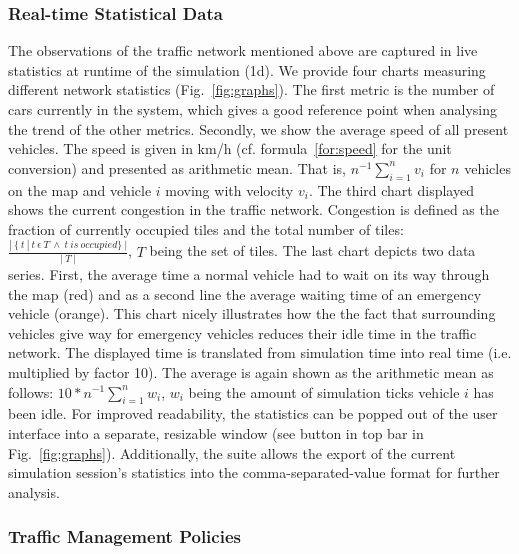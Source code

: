 \subsubsection*{Real-time Statistical Data}

The observations of the traffic network mentioned above are captured in live statistics at runtime of the simulation (1d).  We provide four charts measuring different network statistics (Fig.~\ref{fig:graphs}). The first metric is the number of cars currently in the system, which gives a good reference point when analysing the trend of the other metrics. Secondly, we show the average speed of all present vehicles. The speed is given in km/h (cf. formula~\ref{for:speed} for the unit conversion) and presented as arithmetic mean. That is, $ n^{-1}\sum\limits_{i=1}^n v_i$ for $n$ vehicles on the map and vehicle $i$ moving with velocity $v_i$. The third chart displayed shows the current congestion in the traffic network. Congestion is defined as the fraction of currently occupied tiles and the total number of tiles: $\frac{|\:\lbrace \:t\:|\:t\:\epsilon\:T\:\wedge\:t\:is\:occupied\rbrace\:|}{|\:T\:|}$, $T$ being the set of tiles. The last chart depicts two data series. First, the average time a normal vehicle had to wait on its way through the map (red) and as a second line the average waiting time of an emergency vehicle (orange). This chart nicely illustrates how the the fact that surrounding vehicles give way for emergency vehicles reduces their idle time in the traffic network. The displayed time is translated from simulation time into real time (i.e. multiplied by factor 10). The average is again shown as the arithmetic mean as follows: $10*n^{-1}\sum\limits_{i=1}^n w_i$, $w_i$ being the amount of simulation ticks vehicle $i$ has been idle. For improved readability, the statistics can be popped out of the user interface into a separate, resizable window (see button in top bar in Fig.~\ref{fig:graphs}). Additionally, the suite allows the export of the current simulation session's statistics into the comma-separated-value format for further analysis.

\subsubsection*{Traffic Management Policies}

